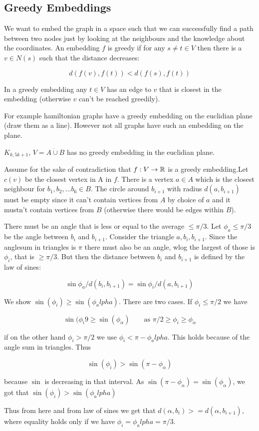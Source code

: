 

\subsection{Greedy Embeddings}

We want to embed the graph in a space such that we can successfully find a path between two nodes just by looking at the neighbours and the knowledge about the coordinates. An embedding $f$ is greedy if for any $s\neq t\in V$ then there is a $v\in N(s)$ such that the distance decreases:

\[d(f(v),f(t)) < d(f(s),f(t))\]

In a greedy embedding any $t\in V$ has an edge to $v$ that is closest in the embedding (otherwise $v$ can't be reached greedily).

For example hamiltonian graphs have a greedy embedding on the euclidian plane (draw them as a line). However not all graphs have such an embedding on the plane.

\begin{lem} $K_{k,5k+1}$, $V=A\dot \cup B$ has no greedy embedding in the euclidian plane. 
\end{lem}

\begin{pr} Assume for the sake of contradiction that $f:V\rightarrow \mathbb{R}$ is a greedy embedding.Let $c(v)$ be the closest vertex in A in $f$. There is a vertex $a\in A$ which is the closest neighbour for $b_1,b_2,\ldots b_6\in B$. The circle around $b_{i+1}$ with radius $d(a,b_{i+1})$ must be empty since it can't contain vertices from $A$ by choice of $a$ and it mustn't contain vertices from $B$ (otherwise there would be edges within $B$). 


There must be an angle that is less or equal to the average $\leq \pi/3$. Let $\phi_a\leq \pi/3$ be the angle between $b_i$ and $b_{i+1}$. Consider the triangle $a,b_i,b_{i+1}$. Since the anglesum in triangles is $\pi$ there must also be an angle, wlog the largest of those is $\phi_i$, that is $\geq \pi/3$. But then the distance between $b_i$ and $b_{i+1}$ is defined by the law of sines:

\[\sin \phi_a / d(b_i,b_{i+1}) = \sin \phi_i / d(a,b_{i+1})\]

We show $\sin(\phi_i) \geq \sin(\phi_alpha)$. There are two cases. If $\phi_i \leq \pi/2$ we have

\[\sin(\phi_i9 \geq \sin(\phi_\alpha) \qquad \text{as } \pi/2\geq \phi_i\geq \phi_\alpha\]

if on the other hand $\phi_i > \pi/2$ we use $\phi_i < \pi -\phi_alpha$. This holds because of the angle sum in triangles. Thus

\[\sin(\phi_i) > \sin(\pi -\phi_\alpha)\]

because $\sin$ is decreasing in that interval. As $\sin(\pi - \phi_\alpha) = \sin(\phi_\alpha)$, we got that $\sin(\phi_i) > \sin(\phi_alpha)$

Thus from here and from law of sines we get that $d(\alpha, b_i) >= d(\alpha, b_{i+1})$, where equality holds only if we have $\phi_i = \phi_alpha = \pi/3$.
\end{pr}

